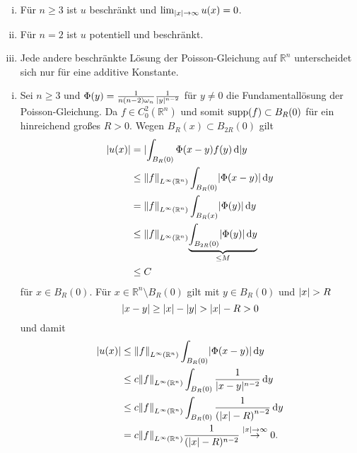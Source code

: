 
\begin{bemerkung}
	\begin{enumerate}[(i)]
		\item Für $n \geq3$ ist $u$ beschränkt und $\lim_{\lvert x\rvert \to \infty}u(x)=0$.
		\item Für $n=2$ ist $u$ potentiell und beschränkt.
		\item Jede andere beschränkte Lösung der Poisson-Gleichung auf $\mathbb{R}^n$ unterscheidet sich nur für eine additive Konstante.
	\end{enumerate}
	\begin{beweis}
		\begin{enumerate}[(i)]
			\item Sei $n \geq  3$ und $\Phi(y)= \frac{1}{n(n-2)\omega_n}\frac{1}{\lvert y\rvert^{n-2}}$ für $y \neq 0$ die Fundamentallösung der Poisson-Gleichung. 
			Da $f \in C^2_0(\mathbb{R}^n)$ und somit $ \operatorname{supp}(f) \subset B_R(0)$ für ein hinreichend großes $R > 0$. Wegen $B_R(x) \subset B_{2R}(0)$ gilt
			\begin{align*}
				\abs{u(x)} &= \abs{ \int_{B_R(0)}^{} \Phi(x-y)f(y) \,\mathrm{d}}y \\
				& \leq \norm{f}_{L^{\infty}(\mathbb{R}^n)} \int_{B_R(0)}^{}\abs{\Phi(x-y)} \,\mathrm{d}y \\
				&= \norm{f}_{L^{\infty}(\mathbb{R}^n)} \int_{B_R(x)}^{} \abs{\Phi(y)} \,\mathrm{d}y \\
				& \leq \norm{f}_{L^{\infty}(\mathbb{R}^n)} \underset{\leq M}{\underbrace{\int_{B_{2R}(0)}^{} \abs{\Phi(y)} \,\mathrm{d}y}} \\
				& \leq C
			\end{align*}
			für $x \in B_R(0)$. Für $x \in \mathbb{R}^n \setminus B_R(0)$ gilt mit $y \in B_R(0)$ und $\lvert x\rvert> R$
			\begin{equation}
				\lvert x-y\rvert \geq \lvert x\rvert - \lvert y\rvert > \lvert x\rvert - R > 0 
			\end{equation}
			und damit
			\begin{align*}
				\abs{u(x)} &\leq \norm{f}_{L^{\infty}(\mathbb{R}^n)} \int_{B_R(0)}^{} \abs{ \Phi(x-y)} \,\mathrm{d}y \\
				&\leq c \norm{f}_{L^{\infty}(\mathbb{R}^n)} \int_{B_R(0)}^{} \frac{1}{\abs{x-y}^{n-2}} \,\mathrm{d}y \\
				& \leq  c \norm{f}_{L^{\infty}(\mathbb{R}^n)} \int_{B_R(0)}^{} \frac{1}{\left( \abs{x}-R \right)^{n-2}} \,\mathrm{d}y \\
				& = c \norm{f}_{L^{\infty}(\mathbb{R}^n)} \frac{1}{(\abs{x}-R)^{n-2}} \stackrel{\abs{x}\to \infty}{\to} 0 .

\end{align*}
\end{enumerate}
\end{beweis}
\end{bemerkung}
